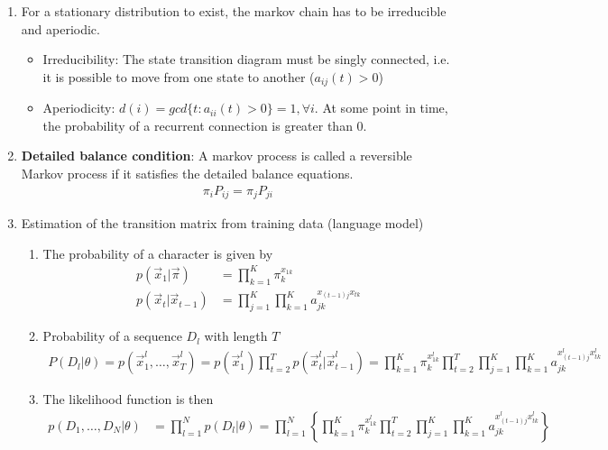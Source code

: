 \documentclass[12pt,twoside]{article}
\begin{document}
\begin{enumerate}
		\item For a stationary distribution to exist, the markov chain has to be irreducible and aperiodic.
			\begin{itemize}
				\item Irreducibility: The state transition diagram must be singly connected, i.e. it is possible to move from one state to another ($a_{ij}(t)>0$)
				\item Aperiodicity: $d(i) = gcd\lbrace t: a_{ii}(t)>0\rbrace =1, \forall i$. At some point in time, the probability of a recurrent connection is greater than 0.
			\end{itemize}
	
		\item \textbf{Detailed balance condition}: A markov process is called a reversible Markov process if it satisfies the detailed balance equations.
			\begin{align*}
				\pi_i P_{ij} = \pi_j P_{ji}
			\end{align*}
	
		\item Estimation of the transition matrix from training data (language model)\\
			\begin{enumerate}
				\item The probability of a character is given by
					\begin{align*}
						p(\vec{x}_1\vert \vec{\pi}) & = \prod_{k=1}^K \pi_k^{x_{1k}}\\
						p(\vec{x}_t\vert \vec{x}_{t-1}) & = \prod_{j=1}^K \prod_{k=1}^K a_{jk}^{x_{(t-1)j}x_{tk}}				
					\end{align*}
					
				\item Probability of a sequence $D_l$ with length $T$
					\begin{align*}
						P(D_l\vert \theta) 
						 = p(\vec{x}_1^l, \ldots, \vec{x}_T^l)
						 = p(\vec{x}_1^l) \prod_{t=2}^T p(\vec{x}_t^l \vert \vec{x}_{t-1}^l)
						 = \prod_{k=1}^K \pi_k^{x_{1k}^l}\prod_{t=2}^T\prod_{j=1}^K \prod_{k=1}^K a_{jk}^{x^l_{(t-1)j}x^l_{tk}}	
					\end{align*}
					
				\item The likelihood function is then
					\begin{align*}
						p(D_1,\ldots, D_N\vert \theta) 
						& = \prod_{l=1}^N p(D_l\vert \theta)
						 = \prod_{l=1}^N \left\lbrace  \prod_{k=1}^K \pi_k^{x_{1k}^l}\prod_{t=2}^T\prod_{j=1}^K \prod_{k=1}^K a_{jk}^{x^l_{(t-1)j}x^l_{tk}} \right\rbrace
					\end{align*}
					

\end{enumerate}
\end{enumerate}
\end{document}
